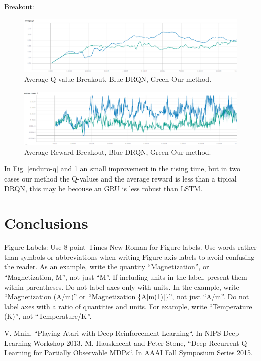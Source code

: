 \documentclass[conference]{IEEEtran}
\begin{document}
Breakout:

\begin{figure}[htbp]
\centerline{\includegraphics[width=\linewidth]{images/breakout-avQ-drqb-bl-dgruqn-gr.png}}
\caption{Average Q-value Breakout, Blue DRQN, Green Our method.}
\label{breakout-q}
\end{figure}

\begin{figure}[htbp]
\centerline{\includegraphics[width=\linewidth]{images/breakout-av-rew-drqn-bl-dgruqn-gr.png}}
\caption{Average Reward Breakout, Blue DRQN, Green Our method.}
\label{breakout-r}
\end{figure}

In Fig. \ref{enduro-q} and \ref{breakout-q} an small  improvement in the rising time, but in two cases our method the Q-values and the average reward is less than a tipical DRQN, this may be becouse an GRU is less robust than LSTM.

\section{Conclusions}

Figure Labels: Use 8 point Times New Roman for Figure labels. Use words 
rather than symbols or abbreviations when writing Figure axis labels to 
avoid confusing the reader. As an example, write the quantity 
``Magnetization'', or ``Magnetization, M'', not just ``M''. If including 
units in the label, present them within parentheses. Do not label axes only 
with units. In the example, write ``Magnetization (A/m)'' or ``Magnetization 
\{A[m(1)]\}'', not just ``A/m''. Do not label axes with a ratio of 
quantities and units. For example, write ``Temperature (K)'', not 
``Temperature/K''.


\begin{thebibliography}{00}
 V. Mnih, ``Playing Atari with Deep Reinforcement Learning``. In NIPS Deep Learning Workshop 2013.
 M. Hausknecht and Peter Stone, ``Deep Recurrent Q-Learning for Partially Observable MDPs``. In AAAI Fall Symposium Series 2015.
\end{thebibliography}
\end{document}
